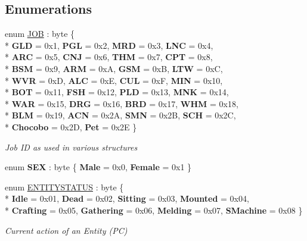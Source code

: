 \subsection*{Enumerations}
\begin{DoxyCompactItemize}
\item 
enum \hyperlink{namespaceffxivlib_a7273810711af045adb7151580e025a86}{J\-O\-B} \-: byte \{ \\*
{\bfseries G\-L\-D} = 0x1, 
{\bfseries P\-G\-L} = 0x2, 
{\bfseries M\-R\-D} = 0x3, 
{\bfseries L\-N\-C} = 0x4, 
\\*
{\bfseries A\-R\-C} = 0x5, 
{\bfseries C\-N\-J} = 0x6, 
{\bfseries T\-H\-M} = 0x7, 
{\bfseries C\-P\-T} = 0x8, 
\\*
{\bfseries B\-S\-M} = 0x9, 
{\bfseries A\-R\-M} = 0x\-A, 
{\bfseries G\-S\-M} = 0x\-B, 
{\bfseries L\-T\-W} = 0x\-C, 
\\*
{\bfseries W\-V\-R} = 0x\-D, 
{\bfseries A\-L\-C} = 0x\-E, 
{\bfseries C\-U\-L} = 0x\-F, 
{\bfseries M\-I\-N} = 0x10, 
\\*
{\bfseries B\-O\-T} = 0x11, 
{\bfseries F\-S\-H} = 0x12, 
{\bfseries P\-L\-D} = 0x13, 
{\bfseries M\-N\-K} = 0x14, 
\\*
{\bfseries W\-A\-R} = 0x15, 
{\bfseries D\-R\-G} = 0x16, 
{\bfseries B\-R\-D} = 0x17, 
{\bfseries W\-H\-M} = 0x18, 
\\*
{\bfseries B\-L\-M} = 0x19, 
{\bfseries A\-C\-N} = 0x2\-A, 
{\bfseries S\-M\-N} = 0x2\-B, 
{\bfseries S\-C\-H} = 0x2\-C, 
\\*
{\bfseries Chocobo} = 0x2\-D, 
{\bfseries Pet} = 0x2\-E
 \}
\begin{DoxyCompactList}\small\item\em Job I\-D as used in various structures \end{DoxyCompactList}\item 
enum {\bfseries S\-E\-X} \-: byte \{ {\bfseries Male} = 0x0, 
{\bfseries Female} = 0x1
 \}
\item 
enum \hyperlink{namespaceffxivlib_a93f054414b7ccf7ba7c36f54fcc392f5}{E\-N\-T\-I\-T\-Y\-S\-T\-A\-T\-U\-S} \-: byte \{ \\*
{\bfseries Idle} = 0x01, 
{\bfseries Dead} = 0x02, 
{\bfseries Sitting} = 0x03, 
{\bfseries Mounted} = 0x04, 
\\*
{\bfseries Crafting} = 0x05, 
{\bfseries Gathering} = 0x06, 
{\bfseries Melding} = 0x07, 
{\bfseries S\-Machine} = 0x08
 \}
\begin{DoxyCompactList}\small\item\em Current action of an Entity (P\-C) \end{DoxyCompactList}\item 

\end{DoxyCompactItemize}
